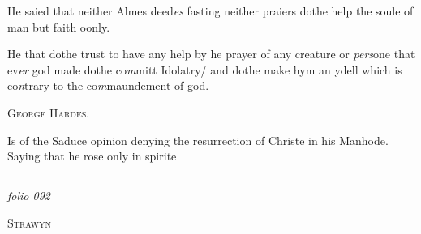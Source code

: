 \documentclass[12pt, a4paper]{book}
\begin{document}
		\ifthenelse{\isodd{\thepage}}
		{\reversemarginpar}
		{\normalmarginpar}
		He saied that neither Almes deed\textit{es} fasting neither
 praiers dothe help the soule of man but faith oonly.
 
		\ifthenelse{\isodd{\thepage}}
		{\reversemarginpar}
		{\normalmarginpar}
		He that dothe trust to have any help by he prayer
 of any creature or \textit{pers}one that ev\textit{er} god made
 dothe co\textit{m}mitt Idolatry/ and dothe make hym an
 ydell which is co\textit{n}trary to the co\textit{m}maundement of god.
 

            
            	
				\begin{center} \begin{large} {\scshape George Hardes.} \end{large} \end{center}
			

            	
			
            		
		\ifthenelse{\isodd{\thepage}}
		{\reversemarginpar}
		{\normalmarginpar}
		Is of the Saduce opinion denying the resurrection
 of Christe in his Manhode. Saying that he rose
 only in spirite


            
\dotfill
					  \subsection*{}  \subsection*{}  \subsection*{}

\textit{folio 092}


            
               
				\begin{center} \begin{large} {\scshape Strawyn} \end{large} \end{center}
			
\end{document}
